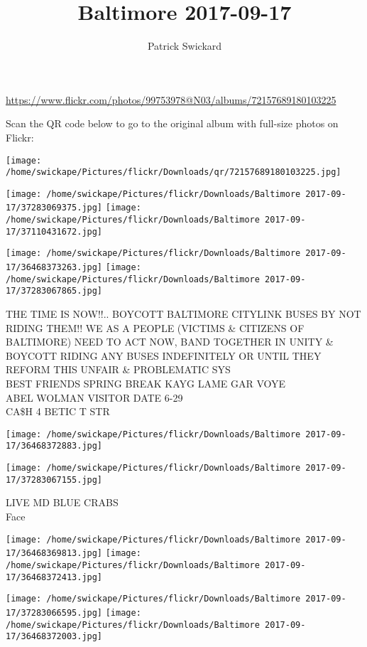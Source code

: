 \documentclass[10pt,letterpaper]{article}
\title{Baltimore 2017-09-17}
\author{Patrick Swickard}
\date{}
\begin{document}
\maketitle

\url{https://www.flickr.com/photos/99753978@N03/albums/72157689180103225}

Scan the QR code below to go to the original album with full-size photos on Flickr:

\texttt{[image: /home/swickape/Pictures/flickr/Downloads/qr/72157689180103225.jpg]}
\pagebreak

\texttt{[image: /home/swickape/Pictures/flickr/Downloads/Baltimore 2017-09-17/37283069375.jpg]}
\texttt{[image: /home/swickape/Pictures/flickr/Downloads/Baltimore 2017-09-17/37110431672.jpg]}

\texttt{[image: /home/swickape/Pictures/flickr/Downloads/Baltimore 2017-09-17/36468373263.jpg]}
\texttt{[image: /home/swickape/Pictures/flickr/Downloads/Baltimore 2017-09-17/37283067865.jpg]}

THE TIME IS NOW!!..  BOYCOTT BALTIMORE CITYLINK BUSES BY NOT RIDING THEM!!  WE AS A PEOPLE (VICTIMS \& CITIZENS OF BALTIMORE) NEED TO ACT NOW, BAND TOGETHER IN UNITY \& BOYCOTT RIDING ANY BUSES INDEFINITELY OR UNTIL THEY REFORM THIS UNFAIR \& PROBLEMATIC SYS\\
BEST FRIENDS SPRING BREAK KAYG LAME GAR VOYE\\
ABEL WOLMAN VISITOR DATE 6{-}29\\
CA\$H 4 BETIC T STR
\pagebreak

\texttt{[image: /home/swickape/Pictures/flickr/Downloads/Baltimore 2017-09-17/36468372883.jpg]}

\vspace{0.25in}
\texttt{[image: /home/swickape/Pictures/flickr/Downloads/Baltimore 2017-09-17/37283067155.jpg]}

LIVE MD BLUE CRABS\\
Face
\pagebreak

\texttt{[image: /home/swickape/Pictures/flickr/Downloads/Baltimore 2017-09-17/36468369813.jpg]}
\texttt{[image: /home/swickape/Pictures/flickr/Downloads/Baltimore 2017-09-17/36468372413.jpg]}

\texttt{[image: /home/swickape/Pictures/flickr/Downloads/Baltimore 2017-09-17/37283066595.jpg]}
\texttt{[image: /home/swickape/Pictures/flickr/Downloads/Baltimore 2017-09-17/36468372003.jpg]}
\end{document}
